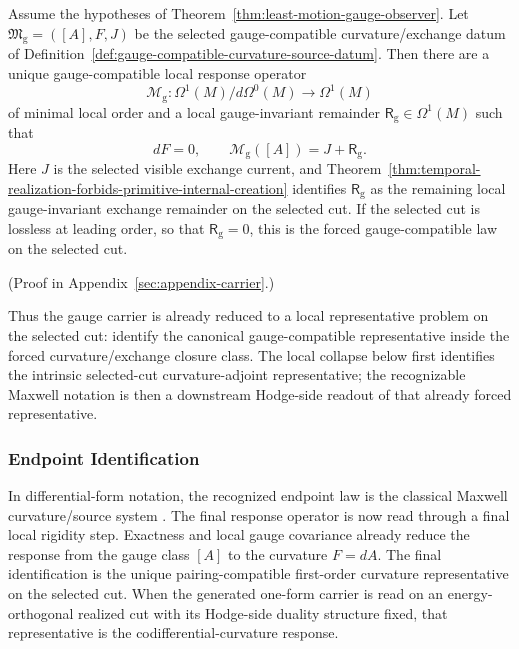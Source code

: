 \begin{theorem}
\label{thm:induced-gauge-compatible-law}
Assume the hypotheses of
Theorem~\ref{thm:least-motion-gauge-observer}. Let
\(\mathfrak M_{\mathrm g}=([A],F,J)\) be the selected
gauge-compatible curvature/exchange datum of
Definition~\ref{def:gauge-compatible-curvature-source-datum}. Then there are a
unique gauge-compatible local response operator
\[
\mathcal M_{\mathrm g}:\Omega^1(M)/d\Omega^0(M)\to\Omega^1(M)
\]
of minimal local order and a local gauge-invariant remainder
\(\mathsf R_{\mathrm g}\in\Omega^1(M)\) such that
\[
dF=0,
\qquad
\mathcal M_{\mathrm g}([A])=J+\mathsf R_{\mathrm g}.
\]
Here \(J\) is the selected visible exchange current, and
Theorem~\ref{thm:temporal-realization-forbids-primitive-internal-creation}
identifies \(\mathsf R_{\mathrm g}\) as the remaining local gauge-invariant
exchange remainder on the selected cut.
If the selected cut is lossless at leading order, so that
\(\mathsf R_{\mathrm g}=0\), this is the forced gauge-compatible law on the
selected cut.
\end{theorem}

(Proof in Appendix~\ref{sec:appendix-carrier}.)

Thus the gauge carrier is already reduced to a local representative problem on
the selected cut: identify the canonical gauge-compatible representative
inside the forced curvature/exchange closure class. The local collapse below
first identifies the intrinsic selected-cut curvature-adjoint representative;
the recognizable Maxwell notation is then a downstream Hodge-side readout of
that already forced representative.

\subsubsection{Endpoint Identification}

In differential-form notation, the recognized endpoint law is the classical
Maxwell curvature/source system \cite{Maxwell1865}. The final response
operator is now read through a final local rigidity step. Exactness and local
gauge covariance already reduce the response from the gauge class \([A]\) to
the curvature \(F=dA\). The final identification is the unique
pairing-compatible first-order curvature representative on the selected cut.
When the generated one-form carrier is read on an energy-orthogonal realized
cut with its Hodge-side duality structure fixed, that representative is the
codifferential-curvature response.

